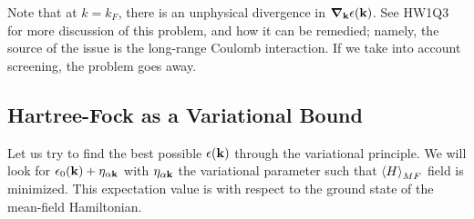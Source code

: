 Note that at $k = k_F$, there is an unphysical divergence in $\nabla_\v{k}\e(\v{k})$. See HW1Q3 for more discussion of this problem, and how it can be remedied; namely, the source of the issue is the long-range Coulomb interaction. If we take into account screening, the problem goes away.

\subsection{Hartree-Fock as a Variational Bound}
Let us try to find the best possible $\epsilon(\mathbf{k})$ through the variational principle. We will look for $\epsilon_0(\mathbf{k}) + \eta_{\alpha\mathbf{k}}$ with $\eta_{\alpha\mathbf{k}}$ the variational parameter such that $\left< H \right>_{MF}$ field is minimized. This expectation value is with respect to the ground state of the mean-field Hamiltonian.

